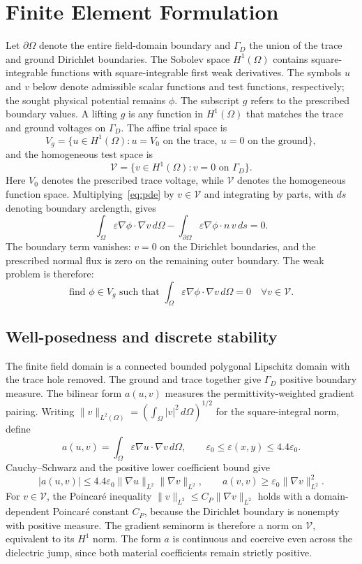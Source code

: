 \documentclass[11pt]{article}
\begin{document}
\section{Finite Element Formulation}
Let $\partial\Omega$ denote the entire field-domain boundary and $\Gamma_D$ the union of the trace and ground Dirichlet boundaries. The Sobolev space $H^1(\Omega)$ contains square-integrable functions with square-integrable first weak derivatives. The symbols $u$ and $v$ below denote admissible scalar functions and test functions, respectively; the sought physical potential remains $\phi$. The subscript $g$ refers to the prescribed boundary values. A lifting $g$ is any function in $H^1(\Omega)$ that matches the trace and ground voltages on $\Gamma_D$. The affine trial space is
\[
V_g=\{u\in H^1(\Omega):u=V_0 \text{ on the trace},\ u=0 \text{ on the ground}\},
\]
and the homogeneous test space is
\[
\mathcal V=\{v\in H^1(\Omega):v=0 \text{ on }\Gamma_D\}.
\]
Here $V_0$ denotes the prescribed trace voltage, while $\mathcal V$ denotes the homogeneous function space. Multiplying~\eqref{eq:pde} by $v\in\mathcal V$ and integrating by parts, with $ds$ denoting boundary arclength, gives
\[
\int_{\Omega} \varepsilon \nabla\phi\cdot\nabla v\,d\Omega
-\int_{\partial\Omega} \varepsilon \nabla\phi\cdot n\,v\,ds=0.
\]
The boundary term vanishes: $v=0$ on the Dirichlet boundaries, and the prescribed normal flux is zero on the remaining outer boundary. The weak problem is therefore:
\[
\text{find }\phi\in V_g\text{ such that }
\int_{\Omega}\varepsilon \nabla\phi\cdot\nabla v\,d\Omega=0
\quad\forall v\in\mathcal V.
\]

\subsection{Well-posedness and discrete stability}
The finite field domain is a connected bounded polygonal Lipschitz domain with the trace hole removed. The ground and trace together give $\Gamma_D$ positive boundary measure. The bilinear form $a(u,v)$ measures the permittivity-weighted gradient pairing. Writing $\|v\|_{L^2(\Omega)}=(\int_\Omega |v|^2\,d\Omega)^{1/2}$ for the square-integral norm, define
\[
a(u,v)=\int_\Omega\varepsilon\nabla u\cdot\nabla v\,d\Omega,
\qquad \varepsilon_0\le\varepsilon(x,y)\le4.4\varepsilon_0.
\]
Cauchy--Schwarz and the positive lower coefficient bound give
\begin{equation}
|a(u,v)|\le4.4\varepsilon_0\|\nabla u\|_{L^2}\|\nabla v\|_{L^2},
\qquad a(v,v)\ge\varepsilon_0\|\nabla v\|_{L^2}^2.
\label{eq:coercivity}
\end{equation}
For $v\in\mathcal V$, the Poincar\'e inequality
$\|v\|_{L^2}\le C_P\|\nabla v\|_{L^2}$ holds with a domain-dependent Poincar\'e constant $C_P$, because the Dirichlet boundary is nonempty with positive measure. The gradient seminorm is therefore a norm on $\mathcal V$, equivalent to its $H^1$ norm. The form $a$ is continuous and coercive even across the dielectric jump, since both material coefficients remain strictly positive.
\end{document}
